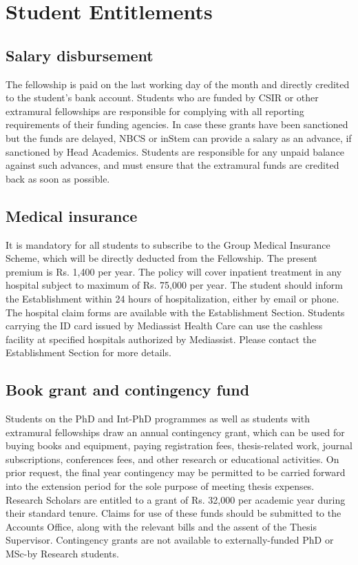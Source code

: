 \documentclass[a4paper]{extarticle}
\begin{document}
\section{Student Entitlements}
\subsection{Salary disbursement}
The fellowship is paid on the last working day of the month and
directly credited to the student’s bank account. Students who are funded by CSIR or other
extramural fellowships are responsible for complying with all reporting requirements of
their funding agencies. In case these grants have been sanctioned but the funds are delayed,
NBCS or inStem can provide a salary as an advance, if sanctioned by Head Academics.
Students are responsible for any unpaid balance against such advances, and must ensure that
the extramural funds are credited back as soon as possible.

\subsection{Medical insurance}
It is mandatory for all students to subscribe to the Group Medical
Insurance Scheme, which will be directly deducted from the Fellowship. The present
premium is Rs. 1,400 per year. The policy will cover inpatient treatment in any hospital
subject to maximum of Rs. 75,000 per year. The student should inform the Establishment
within 24 hours of hospitalization, either by email or phone. The hospital claim forms are
available with the Establishment Section. Students carrying the ID card issued by Mediassist
Health Care can use the cashless facility at specified hospitals authorized by Mediassist.
Please contact the Establishment Section for more details.

\subsection{Book grant and contingency fund}
Students on the PhD and Int-PhD programmes as well
as students with extramural fellowships draw an annual contingency grant, which can be
used for buying books and equipment, paying registration fees, thesis-related work, journal
subscriptions, conferences fees, and other research or educational activities. On prior
request, the final year contingency may be permitted to be carried forward into the extension
period for the sole purpose of meeting thesis expenses. Research Scholars are entitled to a
grant of Rs. 32,000 per academic year during their standard tenure. Claims for use of these
funds should be submitted to the Accounts Office, along with the relevant bills and the
assent of the Thesis Supervisor. Contingency grants are not available to externally-funded
PhD or MSc-by Research students.
\end{document}
